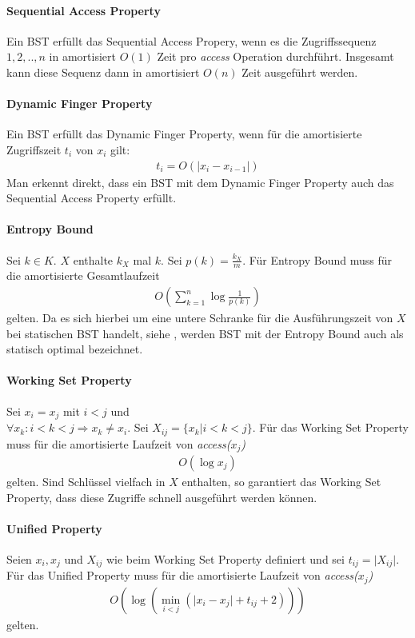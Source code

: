 \documentclass[a4paper,12pt]{article}
\begin{document}
\paragraph{Sequential Access Property}
Ein BST erfüllt das Sequential Access Propery, wenn es die Zugriffssequenz $1,2,..,n$ in amortisiert $O(1)$ Zeit pro \textit{access} Operation durchführt. Insgesamt kann diese Sequenz dann in amortisiert  $O(n)$ Zeit ausgeführt werden.

\paragraph{Dynamic Finger Property}
Ein BST erfüllt das Dynamic Finger Property, wenn für die amortisierte Zugriffszeit $t_i$ von $x_i$ gilt: 
\begin{align*}
t_i = O\left(\vert x_i - x_{i-1} \vert \right)
\end{align*} 
Man erkennt direkt, dass ein BST mit dem Dynamic Finger Property  auch das Sequential Access Property erfüllt.

\paragraph{Entropy Bound}
Sei $k \in K$. $X$ enthalte $k_X$ mal $k$. Sei $p(k) = \frac {k_X}{m}$. Für Entropy Bound muss für die amortisierte Gesamtlaufzeit 
\begin{align*}
O\left(\sum_{k = 1}^{n} \log  \frac{1}{p(k)} \right) 
\end{align*}
gelten. Da es sich hierbei um eine untere Schranke für die Ausführungszeit von $X$ bei statischen BST handelt, siehe \cite{staticOptimal}, werden BST mit der Entropy Bound auch als statisch optimal bezeichnet.  


\paragraph{Working Set Property}
Sei $x_i = x_j$ mit $i < j$ und \\ 
$\forall x_k \colon i < k < j \Rightarrow x_k \neq x_i$. Sei  $X_{ij} = \{x_k \vert i < k < j\}$.  Für das Working Set Property muss für die amortisierte Laufzeit von \textit{ access($x_j$) }
\begin{align*}
O\left(\log x_j\right)
\end{align*} 
gelten. Sind Schlüssel vielfach in $X$ enthalten, so garantiert das Working Set Property, dass diese Zugriffe schnell ausgeführt werden können. 

\paragraph{Unified Property}
Seien $x_i, x_j$ und $X_{ij}$ wie beim Working Set Property definiert und sei $t_{ij} =\vert X_{ij}\vert$. Für das Unified Property muss für die amortisierte Laufzeit von \textit{ access($x_j$) }  
\begin{align*}
O \left(\log \left( \min_{i < j} \left(\vert x_i - x_j \vert + t_{ij} + 2   \right)\right)\right)
\end{align*} 
gelten.
\newpage


\end{document}
